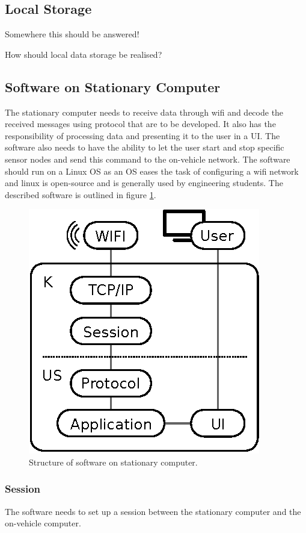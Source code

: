 
\subsection{Local Storage}
Somewhere this should be answered!

How should local data storage be realised?

\subsection{Software on Stationary Computer}
The stationary computer needs to receive data through wifi and decode the received messages using protocol that are to be developed. 
It also has the responsibility of processing data and presenting it to the user in a UI.
The software also needs to have the ability to let the user start and stop specific sensor nodes and send this command to the on-vehicle network. 
The software should run on a Linux OS as an OS eases the task of configuring a wifi network and linux is open-source and is generally used by engineering students.
The described software is outlined in figure \ref{fig:setup_ui}.


\begin{figure}[h]
	\centering
	\includegraphics{graphics/stationary_software.eps}
	\caption{Structure of software on stationary computer.}
	\label{fig:setup_ui}
\end{figure}

\subsubsection*{Session}
The software needs to set up a session between the stationary computer and the on-vehicle computer.

